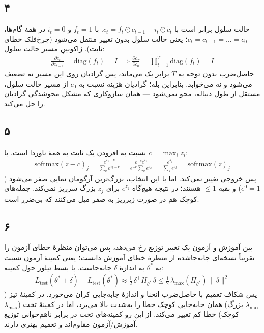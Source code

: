 \subsection*{۴}
حالت سلول
برابر است با $c_t = f_t\odot c_{t-1} + i_t\odot\tilde c_t$. با $f_t=1$ و $i_t=0$ در همهٔ گام‌ها، $c_t=c_{t-1}=\dots=c_0$؛ یعنی حالت سلول بدون تغییر منتقل می‌شود (چرخ‌فلک خطای ثابت). ژاکوبینِ مسیر حالت سلول:
\begin{align*}
\frac{\partial c_t}{\partial c_{t-1}} = \mathrm{diag}(f_t) = I
\implies
\frac{\partial c_T}{\partial c_0} = \prod_{t=1}^{T}\mathrm{diag}(f_t) = I
\end{align*}
حاصل‌ضرب بدون توجه به $T$ برابر یک می‌ماند، پس گرادیان روی این مسیر نه تضعیف می‌شود و نه می‌خوابد. بنابراین بله؛ گرادیان هزینه نسبت به $c_0$ از مسیر حالت سلول، مستقل از طول دنباله، محو نمی‌شود — همان سازوکاری که مشکل محوشدگی گرادیان را حل می‌کند.

\subsection*{۵}
نسبت به افزودن یک ثابت به همهٔ
ناوردا است. با $c=\max_i z_i$:
\begin{align*}
\mathrm{softmax}(z-c)_j
= \frac{e^{z_j-c}}{\sum_k e^{z_k-c}}
= \frac{e^{-c}e^{z_j}}{e^{-c}\sum_k e^{z_k}}
= \frac{e^{z_j}}{\sum_k e^{z_k}}
= \mathrm{softmax}(z)_j
\end{align*}
پس خروجی تغییر نمی‌کند. اما با این انتخاب، بزرگ‌ترین آرگومان نمایی صفر می‌شود ($e^0=1$) و بقیه $\le 1$ هستند؛ در نتیجه هیچ‌گاه $e^{z_j}$ برای $z_j$ بزرگ سرریز نمی‌کند. جمله‌های کوچک هم در صورت زیرریز به صفر میل می‌کنند که بی‌ضرر است.

\subsection*{۶}
بین آموزش و آزمون یک تغییر توزیع رخ می‌دهد، پس می‌توان منظرهٔ خطای آزمون را تقریباً نسخه‌ای جابه‌جاشده از منظرهٔ خطای آموزش دانست؛ یعنی کمینهٔ آزمون نسبت به $\theta^*$ به اندازهٔ $\delta$ جابه‌جاست. با بسط تیلور حول کمینه:
\begin{align*}
L_{\text{test}}(\theta^*+\delta) - L_{\text{test}}(\theta^*)
\approx \tfrac{1}{2}\,\delta^\top H_{\theta^*}\,\delta
\le \tfrac{1}{2}\,\lambda_{\max}(H_{\theta^*})\,\|\delta\|^2
\end{align*}
پس شکاف تعمیم با حاصل‌ضرب انحنا و اندازهٔ جابه‌جایی کران می‌خورد. در کمینهٔ تیز ($\lambda_{\max}$ بزرگ) همان جابه‌جایی کوچک خطا را به‌شدت بالا می‌برد، اما در کمینهٔ تخت ($\lambda_{\max}$ کوچک) خطا کم تغییر می‌کند. از این رو کمینه‌های تخت در برابر ناهم‌خوانی توزیع آموزش/آزمون مقاوم‌اند و تعمیم بهتری دارند.

